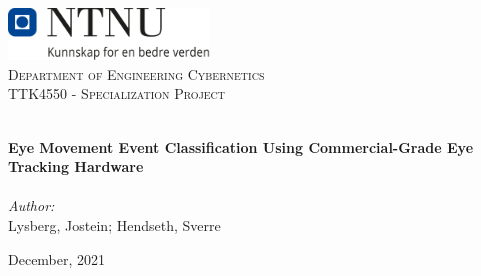 
\begin{titlepage}
\vbox{ }
\vbox{ }
\begin{center}
\includegraphics[width=0.40\textwidth]{Images/NTNU_logo.png}\\[1cm]
\textsc{\LARGE Department of Engineering Cybernetics}\\[1.5cm]
\textsc{\Large TTK4550 - Specialization Project}\\[0.5cm]
\vbox{ }

\HRule \\[0.4cm]
{ \huge \bfseries Eye Movement Event Classification Using Commercial-Grade Eye Tracking Hardware}\\[0.4cm]
\HRule \\[1.5cm]

\large
\emph{Author:}\\
Lysberg, Jostein; Hendseth, Sverre
\vfill

{\large December, 2021}
\end{center}
\end{titlepage}